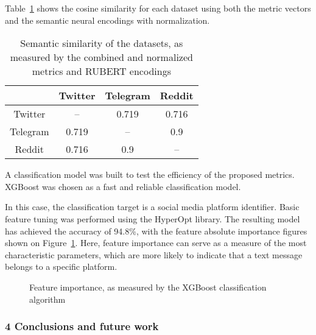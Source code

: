 Table~\cref{tab:semanticSimilarityCombined} shows the cosine similarity for each dataset using both the metric vectors and the semantic neural encodings with normalization.

\begin{table}[ht]%
	\centering
	\caption{Semantic similarity of the datasets, as measured by the combined and normalized metrics and RUBERT encodings}%
	\label{tab:semanticSimilarityCombined}%
		\begin{tabular}{ c  c  c  c  }%
			\toprule
			& Twitter & Telegram & Reddit\\
			\hline
			Twitter & -- & 0.719 & 0.716\\
			Telegram & 0.719 & -- & 0.9 \\
			Reddit & 0.716 & 0.9 & --\\
			\bottomrule
		\end{tabular}%
\end{table}

A classification model was built to test the efficiency of the proposed metrics. XGBoost \cite{ChenGuestrin} was chosen as a fast and reliable classification model.

In this case, the classification target is a social media platform identifier. Basic feature tuning was performed using the HyperOpt library. The resulting model has achieved the accuracy of 94.8\%, with the feature absolute importance figures shown on Figure~\cref{fig:xgBoostFeatureImportance}. Here, feature importance can serve as a measure of the most characteristic parameters, which are more likely to indicate that a text message belongs to a specific platform.

\begin{figure}[ht]
	\caption{Feature importance, as measured by the XGBoost classification algorithm}\label{fig:xgBoostFeatureImportance}
\end{figure}

\subsubsection{4 Conclusions and future work}

